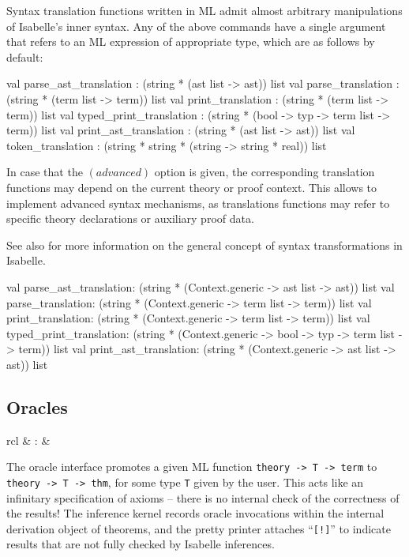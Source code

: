 Syntax translation functions written in ML admit almost arbitrary
manipulations of Isabelle's inner syntax.  Any of the above commands have a
single  argument that refers to an ML expression of appropriate
type, which are as follows by default:

\begin{ttbox}
val parse_ast_translation   : (string * (ast list -> ast)) list
val parse_translation       : (string * (term list -> term)) list
val print_translation       : (string * (term list -> term)) list
val typed_print_translation :
  (string * (bool -> typ -> term list -> term)) list
val print_ast_translation   : (string * (ast list -> ast)) list
val token_translation       :
  (string * string * (string -> string * real)) list
\end{ttbox}

In case that the $(advanced)$ option is given, the corresponding
translation functions may depend on the current theory or proof
context.  This allows to implement advanced syntax mechanisms, as
translations functions may refer to specific theory declarations or
auxiliary proof data.

See also \cite[\S8]{isabelle-ref} for more information on the general concept
of syntax transformations in Isabelle.

\begin{ttbox}
val parse_ast_translation:
  (string * (Context.generic -> ast list -> ast)) list
val parse_translation:
  (string * (Context.generic -> term list -> term)) list
val print_translation:
  (string * (Context.generic -> term list -> term)) list
val typed_print_translation:
  (string * (Context.generic -> bool -> typ -> term list -> term)) list
val print_ast_translation:
  (string * (Context.generic -> ast list -> ast)) list
\end{ttbox}


\subsection{Oracles}

\begin{matharray}{rcl}
   & : &  \\
\end{matharray}

The oracle interface promotes a given ML function \texttt{theory -> T -> term}
to \texttt{theory -> T -> thm}, for some type \texttt{T} given by the user.
This acts like an infinitary specification of axioms -- there is no internal
check of the correctness of the results!  The inference kernel records oracle
invocations within the internal derivation object of theorems, and the pretty
printer attaches ``\texttt{[!]}'' to indicate results that are not fully
checked by Isabelle inferences.

